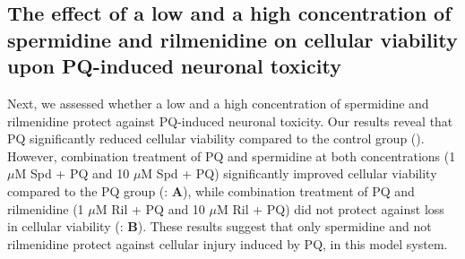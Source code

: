 \subsection{The effect of a low and a high concentration of spermidine and rilmenidine on cellular viability upon PQ-induced neuronal toxicity} 
Next, we assessed whether a low and a high concentration of spermidine and rilmenidine protect against PQ-induced neuronal toxicity. Our results reveal that PQ significantly reduced cellular viability compared to the control group (). However, combination treatment of PQ and spermidine at both concentrations (1 $\mu$M Spd + PQ and 10 $\mu$M Spd + PQ) significantly improved cellular viability compared to the PQ group (: \textbf{A}), while combination treatment of PQ and rilmenidine (1 $\mu$M Ril + PQ and 10 $\mu$M Ril + PQ) did not protect against loss in cellular viability (: \textbf{B}). These results suggest that only spermidine and not rilmenidine protect against cellular injury induced by PQ, in this model system.

